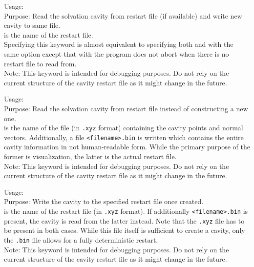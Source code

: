 {
  \noindent
  Usage:   \\[1.0ex] 
  Purpose: Read the solvation cavity from restart file 
    (if available) and write new cavity to same file. \\[1.0ex]
   is the name of the restart file. \\
}
Specifying this keyword is almost equivalent to specifying 
both  and 
 with the same 
 option except that with 
 the program does not abort 
when there is no restart file to read from. \\
Note: This keyword is intended for debugging purposes. 
Do not rely on the current structure of the cavity restart 
file as it might change in the future. 

{
  \noindent
  Usage:   \\[1.0ex] 
  Purpose: Read the solvation cavity from restart file 
    instead of constructing a new one. \\[1.0ex]
   is the name of the file (in \texttt{.xyz} format)
  containing the cavity points and normal vectors. Additionally, a file
  \texttt{<filename>.bin} is written which contains the entire cavity
  information in not human-readable form. While the primary purpose of the
  former is visualization, the latter is the actual restart file.\\
}
Note: This keyword is intended for debugging purposes. 
Do not rely on the current structure of the cavity restart 
file as it might change in the future. 

{
  \noindent
  Usage:   \\[1.0ex] 
  Purpose: Write the cavity to the specified restart file
    once created. \\[1.0ex]
   is the name of the restart file (in \texttt{.xyz} format).
  If additionally \texttt{<filename>.bin} is present, the cavity is read from
  the latter instead. Note that the \texttt{.xyz} file has to be present in both
  cases. While this file itself is sufficient to create a cavity, only the
  \texttt{.bin} file allows for a fully deterministic restart.\\
}
Note: This keyword is intended for debugging purposes. 
Do not rely on the current structure of the cavity restart 
file as it might change in the future. 


